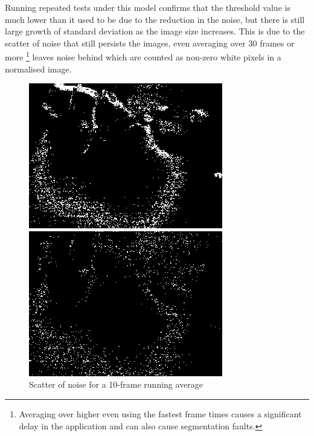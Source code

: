 {{Running repeated tests under this model confirms that the threshold value is much lower than it used to be due to the reduction in the noise, but there is still large growth of standard deviation as the image size increases. This is due to the scatter of noise that still persists the images, even averaging over 30 frames or more \footnote{Averaging over higher even using the fastest frame times causes a significant delay in the application and can also cause segmentation faults.}
leaves noise behind which are counted as non-zero white pixels in a normalised image.

\begin{figure}[H]
\begin{minipage}{0.4\textwidth}
\centering
\includegraphics[width=\textwidth]{../images/scatter1}\caption{Scatter of noise for a 1-frame running average}\label{img:scatter1}
\end{minipage}
\hspace{30pt}
\begin{minipage}{0.4\textwidth}
\centering
\includegraphics[width=\textwidth]{../images/scatter2}\caption{Scatter of noise for a 10-frame running average}\label{img:scatter2}
\end{minipage}
\end{figure}

}}
